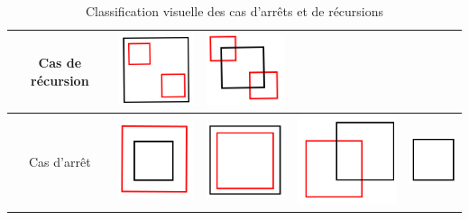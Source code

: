 \begin{table}[htbp]
\centering
 \begin{tabular}{|c|cccc|}
  \hline
  Cas de récursion &  \includegraphics[scale=0.20]{img/QT4}&  \includegraphics[scale=0.20]{img/QT5}& &\\
  \hline
  Cas d'arrêt&  \includegraphics[scale=0.20]{img/QT1}&  \includegraphics[scale=0.20]{img/QT2}&  \includegraphics[scale=0.20]{img/QT3}&  \includegraphics[scale=0.30]{img/QT6}\\
  \hline
 \end{tabular}
 \caption{Classification visuelle des cas d'arrêts et de récursions}
\label{tab:algo}
\end{table}


